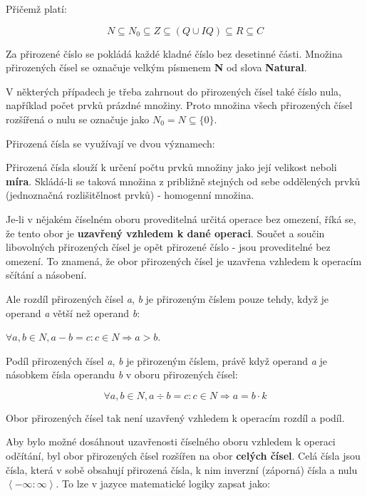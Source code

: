 Přičemž platí:

$$ N \subseteq N_0 \subseteq Z \subseteq (Q \cup IQ) \subseteq R \subseteq C $$


Za přirozené číslo se pokládá každé kladné číslo bez desetinné části. Množina přirozených čísel se označuje velkým písmenem {\bf N} od slova {\bf Natural}. 

V některých případech je třeba zahrnout do přirozených čísel také číslo nula, například počet prvků prázdné množiny. Proto množina všech přirozených čísel rozšířená o nulu se označuje jako $N_0 = N \subseteq \{0\}$.

Přirozená čísla se využívají ve dvou významech:
\vskip 4mm
\vskip 4mm

Přirozená čísla slouží k určení počtu prvků množiny jako její velikost neboli {\bf míra}. Skládá-li se taková množina z približně stejných od sebe oddělených prvků (jednoznačná rozlišitělnost prvků) - homogenní množina.

Je-li v nějakém číselném oboru proveditelná určitá operace bez omezení, říká se, že tento obor je {\bf uzavřený vzhledem k dané operaci}.
Součet a součin libovolných přirozených čísel je opět přirozené číslo - jsou proveditelné bez omezení. To znamená, že obor přirozených čísel je uzavřena vzhledem k operacím sčítání a násobení.

Ale rozdíl přirozených čísel {\it a}, {\it b} je přirozeným číslem pouze tehdy, když je operand {\it a} větší než operand {\it b}:

$\forall a,b \in N, a-b = c: c \in N \Rightarrow  a > b$.

Podíl přirozených čísel {\it a}, {\it b} je přirozeným číslem, právě když operand {\it a} je násobkem čísla operandu {\it b} v oboru přirozených čísel:

$$ \forall a,b \in N, a \div b = c:  c \in N \Rightarrow a = b\cdot k $$

Obor přirozených čísel tak není uzavřený vzhledem k operacím rozdíl a podíl.


Aby bylo možné dosáhnout uzavřenosti číselného oboru vzhledem k operaci odčítání, byl obor přirozených čísel rozšířen na obor {\bf celých čísel}. Celá čísla jsou čísla, která v sobě obsahují přirozená čísla, k nim inverzní (záporná) čísla a nulu $\left< - \infty :\infty \right >  $. To lze v jazyce matematické logiky zapsat jako:

